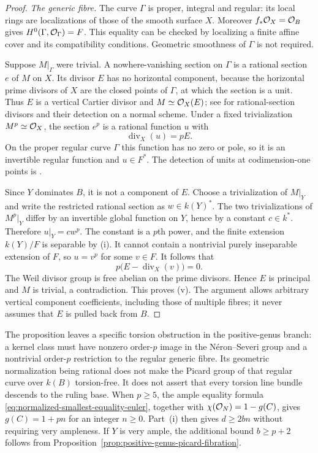 \begin{proof}
\emph{The generic fibre.}
The curve $\Gamma$ is proper, integral and regular: its local rings
are localizations of those of the smooth surface $X$.
Moreover $f_*\mathcal O_X=\mathcal O_B$ gives
$H^0(\Gamma,\mathcal O_\Gamma)=F$. This equality can be checked by
localizing a finite affine cover and its compatibility conditions.
Geometric smoothness of $\Gamma$ is not required.

Suppose $M|_\Gamma$ were trivial. A nowhere-vanishing section
on $\Gamma$ is a rational section $e$ of $M$ on $X$.
Its divisor $E$ has no horizontal component, because the
horizontal prime divisors of $X$ are the closed points of
$\Gamma$, at which the section is a unit.
Thus $E$ is a vertical Cartier divisor and $M\simeq\mathcal O_X(E)$;
see \cite[Tags~0BE6 and 0BE8]{Stacks} for rational-section
divisors and their detection on a normal scheme.
Under a fixed trivialization $M^p\simeq\mathcal O_X$, the section
$e^p$ is a rational function $u$ with
\[
 \operatorname{div}_X(u)=pE.
\]
On the proper regular curve $\Gamma$ this function has no
zero or pole, so it is an invertible regular function and
$u\in F^*$. The detection of units at codimension-one points
is \cite[Tag~031T, Lemma~10.157.6(2)]{Stacks}.

Since $Y$ dominates $B$, it is not a component of $E$.
Choose a trivialization of $M|_Y$ and write the restricted
rational section as $w\in k(Y)^*$.
The two trivializations of $M^p|_Y$ differ by an invertible
global function on $Y$, hence by a constant $c\in k^*$.
Therefore $u|_Y=cw^p$. The constant is a $p$th power, and
the finite extension $k(Y)/F$ is separable by (i).
It cannot contain a nontrivial purely inseparable extension
of $F$, so $u=v^p$ for some $v\in F$.
It follows that
\[
 p\bigl(E-\operatorname{div}_X(v)\bigr)=0.
\]
The Weil divisor group is free abelian on the prime divisors.
Hence $E$ is principal and $M$ is trivial, a contradiction.
This proves (v). The argument allows arbitrary vertical
component coefficients, including those of multiple fibres;
it never assumes that $E$ is pulled back from $B$.
\end{proof}

The proposition leaves a specific torsion obstruction in the
positive-genus branch: a kernel class must have nonzero order-$p$
image in the N\'eron--Severi group and a nontrivial order-$p$
restriction to the regular generic fibre. Its geometric
normalization being rational does not make the Picard group
of that regular curve over $k(B)$ torsion-free.
It does not assert that every torsion line bundle descends to the
ruling base. When $p\geq5$, the ample equality formula
\eqref{eq:normalized-smallest-equality-euler}, together with
$\chi(\mathcal O_N)=1-g(C)$, gives $g(C)=1+pn$ for an integer $n\geq0$.
Part~(i) then gives $d\geq2bn$ without requiring very ampleness.
If $Y$ is very ample, the additional bound $b\geq p+2$ follows from
Proposition~\ref{prop:positive-genus-picard-fibration}.
